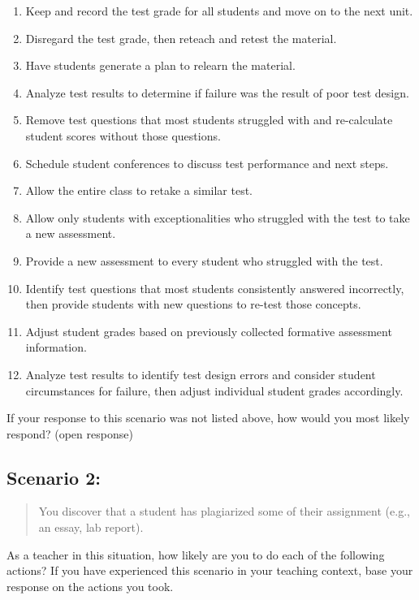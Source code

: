 \documentclass[
]{book}
\providecommand{\tightlist}{%
  \setlength{\itemsep}{0pt}\setlength{\parskip}{0pt}}
\begin{document}
\begin{enumerate}
\def\labelenumi{\arabic{enumi}.}
\tightlist
\item
  Keep and record the test grade for all students and move on to the next unit.
\item
  Disregard the test grade, then reteach and retest the material.
\item
  Have students generate a plan to relearn the material.
\item
  Analyze test results to determine if failure was the result of poor test design.
\item
  Remove test questions that most students struggled with and re-calculate student scores without those questions.
\item
  Schedule student conferences to discuss test performance and next steps.
\item
  Allow the entire class to retake a similar test.
\item
  Allow only students with exceptionalities who struggled with the test to take a new assessment.
\item
  Provide a new assessment to every student who struggled with the test.
\item
  Identify test questions that most students consistently answered incorrectly, then provide students with new questions to re-test those concepts.
\item
  Adjust student grades based on previously collected formative assessment information.
\item
  Analyze test results to identify test design errors and consider student circumstances for failure, then adjust individual student grades accordingly.
\end{enumerate}

If your response to this scenario was not listed above, how would you most likely respond? (open response)

\hypertarget{scenario-2-1}{%
\subsection{Scenario 2:}\label{scenario-2-1}}

\begin{quote}
You discover that a student has plagiarized some of their assignment (e.g., an essay, lab report).
\end{quote}

As a teacher in this situation, how likely are you to do each of the following actions? If you have experienced this scenario in your teaching context, base your response on the actions you took.
\end{document}
